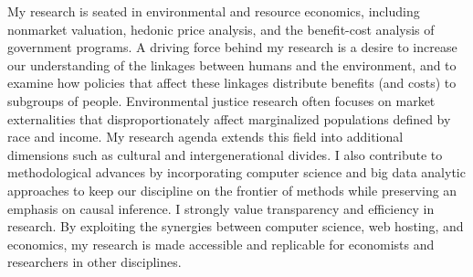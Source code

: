 \documentclass[12pt]{article}
\newcommand{\makeheading}[2][]{\noindent
         \begin{minipage}[t]{\textwidth}%
             {\large \bfseries #2 \hfill #1}\\
             [-0.15\baselineskip]\rule{\columnwidth}{1pt}%
         \end{minipage}}
\begin{document}



\RaggedRight

\noindent My research is seated in environmental and resource economics, including nonmarket valuation, hedonic price analysis, and the benefit-cost analysis of government programs. A driving force behind my research is a desire to increase our understanding of the linkages between humans and the environment, and to examine how policies that affect these linkages distribute benefits (and costs) to subgroups of people. Environmental justice research often focuses on market externalities that disproportionately affect marginalized populations defined by race and income. My research agenda extends this field into additional dimensions such as cultural and intergenerational divides. I also contribute to methodological advances by incorporating computer science and big data analytic approaches to keep our discipline on the frontier of methods while preserving an emphasis on causal inference. I strongly value transparency and efficiency in research. By exploiting the synergies between computer science, web hosting, and economics, my research is made accessible and replicable for economists and researchers in other disciplines.   
\end{document}
